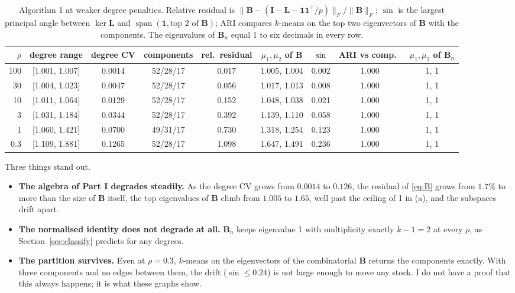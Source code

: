 \documentclass[11pt,a4paper]{article}
\newcommand{\Lap}{\mathbf{L}}
\newcommand{\Bmat}{\mathbf{B}}
\newcommand{\Imat}{\mathbf{I}}
\newcommand{\one}{\mathbf{1}}
\theoremstyle{remark}
\begin{document}
\begin{table}[h]
\centering\small
\footnotesize\setlength{\tabcolsep}{3pt}
\begin{tabular}{rcccccccc}
\toprule
$\rho$ & degree range & degree CV & components & rel.\ residual & $\mu_1,\mu_2$ of $\Bmat$ & $\sin$ & ARI vs comp.\ & $\mu_1,\mu_2$ of $\Bmat_n$ \\
\midrule
100 & [1.001, 1.007] & 0.0014 & 52/28/17 & 0.017 & 1.005, 1.004 & 0.002 & 1.000 & 1, 1 \\
30  & [1.004, 1.023] & 0.0047 & 52/28/17 & 0.056 & 1.017, 1.013 & 0.008 & 1.000 & 1, 1 \\
10  & [1.011, 1.064] & 0.0129 & 52/28/17 & 0.152 & 1.048, 1.038 & 0.021 & 1.000 & 1, 1 \\
3   & [1.031, 1.184] & 0.0344 & 52/28/17 & 0.392 & 1.139, 1.110 & 0.058 & 1.000 & 1, 1 \\
1   & [1.060, 1.421] & 0.0700 & 49/31/17 & 0.730 & 1.318, 1.254 & 0.123 & 1.000 & 1, 1 \\
0.3 & [1.109, 1.881] & 0.1265 & 52/28/17 & 1.098 & 1.647, 1.491 & 0.236 & 1.000 & 1, 1 \\
\bottomrule
\end{tabular}
\caption{Algorithm 1 at weaker degree penalties. Relative residual is
$\lVert\Bmat-(\Imat-\Lap-\one\one^\top/p)\rVert_F/\lVert\Bmat\rVert_F$; $\sin$ is the
largest principal angle between $\ker\Lap$ and $\operatorname{span}(\one,\text{top 2
of }\Bmat)$; ARI compares $k$-means on the top two eigenvectors of $\Bmat$ with the
components. The eigenvalues of $\Bmat_n$ equal 1 to six decimals in every row.}
\label{tab:sweep}
\end{table}

Three things stand out.
\begin{itemize}
\item \textbf{The algebra of Part I degrades steadily.} As the degree CV grows from
  $0.0014$ to $0.126$, the residual of \eqref{eq:B} grows from $1.7\%$ to more than the
  size of $\Bmat$ itself, the top eigenvalues of $\Bmat$ climb from $1.005$ to $1.65$,
  well past the ceiling of 1 in (a), and the subspaces drift apart.
\item \textbf{The normalised identity does not degrade at all.} $\Bmat_n$ keeps
  eigenvalue 1 with multiplicity exactly $k-1=2$ at every $\rho$, as
  Section~\ref{sec:classify} predicts for any degrees.
\item \textbf{The partition survives.} Even at $\rho=0.3$, $k$-means on the
  eigenvectors of the combinatorial $\Bmat$ returns the components exactly. With three
  components and no edges between them, the drift ($\sin\le0.24$) is not large enough
  to move any stock. I do not have a proof that this always happens; it is what these
  graphs show.
\end{itemize}
\end{document}
